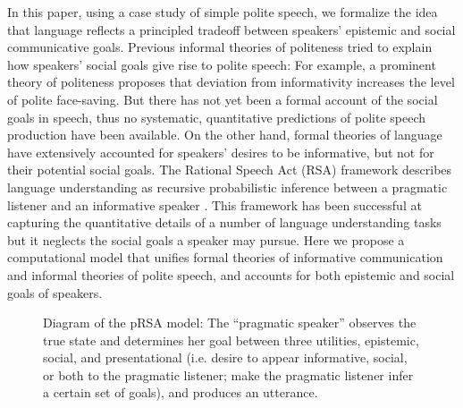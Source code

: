 \documentclass[12pt]{article}
\begin{document}
In this paper, using a case study of simple polite speech, 
we formalize the idea that language reflects a principled tradeoff between speakers' epistemic and social communicative goals.
Previous informal theories of politeness tried to explain how speakers' social goals give rise to polite speech: 
For example, a prominent theory of politeness \cite{brown1987} proposes that
deviation from informativity increases the level of polite face-saving.
But there has not yet been a formal account of the social goals in speech, 
thus no systematic, quantitative predictions of polite speech production have been available.
On the other hand, formal theories of language have extensively accounted for speakers' desires to be informative, 
but not for their potential social goals. 
The Rational Speech Act (RSA) framework describes language understanding 
as recursive probabilistic inference between a pragmatic listener and an informative speaker \cite{goodman2016}. 
This framework has been successful at capturing the quantitative details of a number of language understanding tasks 
but it neglects the social goals a speaker may pursue. 
Here we propose a computational model that unifies formal theories of informative communication and informal theories of polite speech, and accounts for both epistemic and social goals of speakers.

\begin{figure}
\centering
\caption{\label{fig:model}Diagram of the pRSA model: The \enquote{pragmatic speaker} observes the true state and determines her goal between three utilities, epistemic, social, and presentational (i.e. desire to appear informative, social, or both to the pragmatic listener; make the pragmatic listener infer a certain set of goals), and produces an utterance. 
}
\end{figure}
\end{document}
